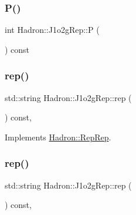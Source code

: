 \mbox{\label{structHadron_1_1J1o2gRep_a23669238b8f2c4ecfbabacf36c40d2b3}} 
\subsubsection{\texorpdfstring{P()}{P()}\hspace{0.1cm}{\footnotesize\ttfamily [2/2]}}
{\footnotesize\ttfamily int Hadron\+::\+J1o2g\+Rep\+::P (\begin{DoxyParamCaption}{ }\end{DoxyParamCaption}) const\hspace{0.3cm}{\ttfamily [inline]}}

\mbox{\label{structHadron_1_1J1o2gRep_a22d769f4159dcc0aff401a4af78dbd37}} 
\subsubsection{\texorpdfstring{rep()}{rep()}\hspace{0.1cm}{\footnotesize\ttfamily [1/2]}}
{\footnotesize\ttfamily std\+::string Hadron\+::\+J1o2g\+Rep\+::rep (\begin{DoxyParamCaption}{ }\end{DoxyParamCaption}) const\hspace{0.3cm}{\ttfamily [inline]}, {\ttfamily [virtual]}}



Implements \mbox{\hyperlink{structHadron_1_1RepRep_ab3213025f6de249f7095892109575fde}{Hadron\+::\+Rep\+Rep}}.

\mbox{\label{structHadron_1_1J1o2gRep_a22d769f4159dcc0aff401a4af78dbd37}} 
\subsubsection{\texorpdfstring{rep()}{rep()}\hspace{0.1cm}{\footnotesize\ttfamily [2/2]}}
{\footnotesize\ttfamily std\+::string Hadron\+::\+J1o2g\+Rep\+::rep (\begin{DoxyParamCaption}{ }\end{DoxyParamCaption}) const\hspace{0.3cm}{\ttfamily [inline]}, {\ttfamily [virtual]}}



